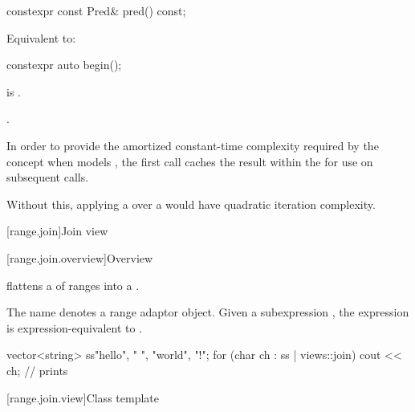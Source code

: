 %
\begin{itemdecl}
constexpr const Pred& pred() const;
\end{itemdecl}

\begin{itemdescr}
\pnum
\effects
Equivalent to: 
\end{itemdescr}

%
\begin{itemdecl}
constexpr auto begin();
\end{itemdecl}

\begin{itemdescr}
\pnum
\expects
{} is .

\pnum
\returns
{}.

\pnum
\remarks
In order to provide the amortized constant-time complexity
required by the  concept
when  models ,
the first call caches the result within the 
for use on subsequent calls.
\begin{note}
Without this,
applying a  over a 
would have quadratic iteration complexity.
\end{note}
\end{itemdescr}

[range.join]{Join view}

[range.join.overview]{Overview}

\pnum
{} flattens a  of ranges into a
.

\pnum
{}%
The name  denotes a
range adaptor object.
Given a subexpression , the expression
 is expression-equivalent to
.

\pnum
\begin{example}
\begin{codeblock}
vector<string> ss{"hello", " ", "world", "!"};
for (char ch : ss | views::join)
  cout << ch;                                   // prints 
\end{codeblock}
\end{example}

[range.join.view]{Class template }

